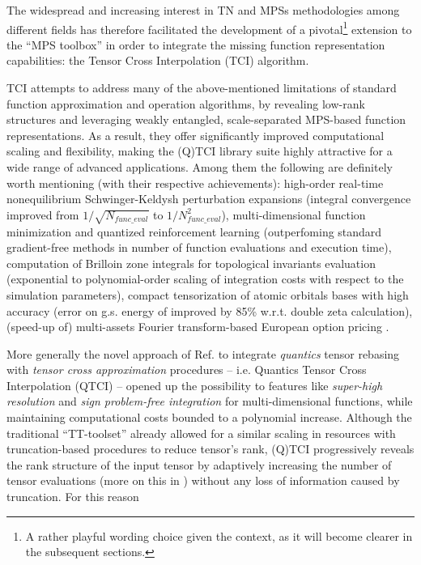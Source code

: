 The widespread and increasing interest in TN and MPSs methodologies among different fields has therefore facilitated the development of a pivotal\footnote{A rather playful wording choice given the context, as it will become clearer in the subsequent sections.} extension to the ``MPS toolbox'' in order to integrate the missing function representation capabilities: the Tensor Cross Interpolation (TCI) algorithm.

TCI attempts to address many of the above-mentioned limitations of standard function approximation and operation algorithms, by revealing low-rank structures and leveraging weakly entangled, scale-separated MPS-based function representations. As a result, they offer significantly improved computational scaling and flexibility, making the (Q)TCI library suite \cite{Fernandez2024} highly attractive for a wide range of advanced applications. Among them the following are definitely worth mentioning (with their respective achievements): high-order real-time nonequilibrium Schwinger-Keldysh perturbation expansions \cite{Fernandez2022} (integral convergence improved from $1/\sqrt{N_{func\_eval}}$ to $1/N_{func\_eval}^2$), multi-dimensional function minimization and quantized reinforcement learning \cite{Sozykin2022} (outperfoming standard gradient-free methods in number of function evaluations and execution time), computation of Brilloin zone integrals for topological invariants evaluation \cite{Ritter2024} (exponential to polynomial-order scaling of integration costs with respect to the simulation parameters), compact tensorization of atomic orbitals bases with high accuracy \cite{Jolly2024} (error on g.s. energy of  improved by 85\% w.r.t. double zeta calculation), (speed-up of) multi-assets Fourier transform-based European option pricing \cite{Sakurai2025}.

More generally the novel approach of Ref. \cite{Fernandez2022, Fernandez2024} to integrate \textit{quantics} tensor rebasing with \textit{tensor cross approximation} procedures -- i.e. Quantics Tensor Cross Interpolation (QTCI) -- opened up the possibility to features like \textit{super-high resolution} and \textit{sign problem-free integration} for multi-dimensional functions, while maintaining computational costs bounded to a polynomial increase. Although the traditional ``TT-toolset'' already allowed for a similar scaling in resources with truncation-based procedures to reduce tensor's rank, (Q)TCI progressively reveals the rank structure of the input tensor by adaptively increasing the number of tensor evaluations (more on this in ) without any loss of information caused by truncation. For this reason 


